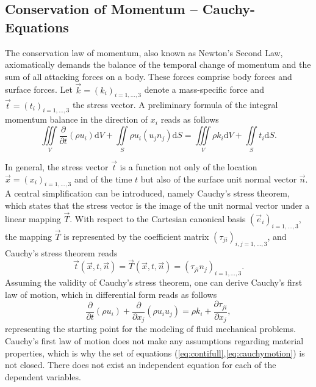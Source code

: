\subsection{Conservation of Momentum -- Cauchy-Equations}

The conservation law of momentum, also known as Newton's Second Law, axiomatically demands the balance of the temporal change of momentum and the sum of all attacking forces on a body. These forces comprise body forces and surface forces. Let \(\vec{k} = \left( k_i \right)_{i=1,\dots,3}\) denote a mass-specific force and \(\vec{t} = \left(t_i\right)_{i=1,\dots,3}\) the stress vector. A preliminary formula of the integral momentum balance in the direction of \(x_i\) reads as follows
\begin{equation}
\label{eq:cauchy}
\iiint\limits_V \frac{\partial }{\partial t}\left(\rho u_i \right) \mathrm{d}V + \iint\limits_S \rho u_i \left( u_j n_j \right) \mathrm{d}S = \iiint\limits_V \rho k_i \mathrm{d}V + \iint\limits_S t_i \mathrm{d}S.
\end{equation}

In general, the stress vector \(\vec{t}\) is a function not only of the location \(\vec{x} = \left( x_i \right)_{i = 1,\dots,3}\) and of the time \(t\) but also of the surface unit normal vector \(\vec{n}\). A central simplification can be introduced, namely Cauchy's stress theorem, which states that the stress vector is the image of the unit normal vector under a linear mapping \(\vec{T}\). With respect to the Cartesian canonical basis \(\left(\vec{e}_i \right)_{i = 1, \dots, 3}\), the mapping \(\vec{T}\) is represented by the coefficient matrix \( \left(\tau_{ji}\right)_{i,j = 1,\dots,3}\), and Cauchy's stress theorem reads
\begin{displaymath}
  \vec{t}\left(\vec{x},t,\vec{n}\right) = \vec{T}(\vec{x},t,\vec{n}) = \left(\tau_{ji} n_j\right)_{i = 1, \dots, 3}.
\end{displaymath}
Assuming the validity of Cauchy's stress theorem, one can derive Cauchy's first law of motion, which in differential form reads as follows
\begin{equation}
  \label{eq:cauchymotion}
  \frac{\partial }{\partial t} \left(\rho u_i \right)
  + \frac{\partial}{\partial x_j}\left( \rho u_i u_j \right) 
  = \rho k_i + \frac{\partial \tau_{ji}}{\partial x_j},
\end{equation}
representing the starting point for the modeling of fluid mechanical problems. Cauchy's first law of motion does not make any assumptions regarding material properties, which is why the set of equations (\ref{eq:contifull},\ref{eq:cauchymotion}) is not closed. There does not exist an independent equation for each of the dependent variables.

